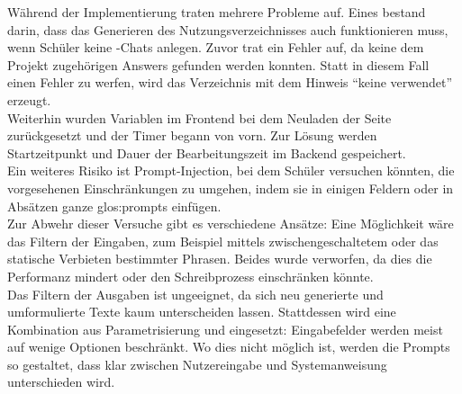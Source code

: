 \documentclass[../main.tex]{subfiles}
\begin{document}
Während der Implementierung traten mehrere Probleme auf. Eines bestand darin, dass das Generieren des Nutzungsverzeichnisses auch funktionieren muss, wenn Schüler keine -Chats anlegen. 
Zuvor trat ein Fehler auf, da keine dem Projekt zugehörigen Answers gefunden werden konnten. Statt in diesem Fall einen Fehler zu werfen, wird das Verzeichnis mit dem Hinweis 
"`keine  verwendet"' erzeugt.\\
Weiterhin wurden Variablen im Frontend bei dem Neuladen der Seite zurückgesetzt und der Timer begann von vorn. Zur Lösung werden Startzeitpunkt und Dauer der Bearbeitungszeit im Backend 
gespeichert.\\ 
Ein weiteres Risiko ist Prompt-Injection, bei dem Schüler versuchen könnten, die vorgesehenen Einschränkungen zu umgehen, indem sie in einigen Feldern oder in Absätzen ganze \gls{glos:prompt}s einfügen.\\ 
Zur Abwehr dieser Versuche gibt es verschiedene Ansätze: Eine Möglichkeit wäre das Filtern der Eingaben, zum Beispiel mittels zwischengeschaltetem  oder das statische Verbieten 
bestimmter Phrasen. Beides wurde verworfen, da dies die Performanz mindert oder den Schreibprozess einschränken könnte.\cite{promptinjection}\\
Das Filtern der Ausgaben ist ungeeignet, da sich neu generierte und umformulierte Texte kaum unterscheiden lassen. Stattdessen wird eine Kombination aus Parametrisierung und  
eingesetzt: Eingabefelder werden meist auf wenige Optionen beschränkt. Wo dies nicht möglich ist, werden die Prompts so gestaltet, dass klar zwischen Nutzereingabe und Systemanweisung unterschieden wird.
\end{document}
